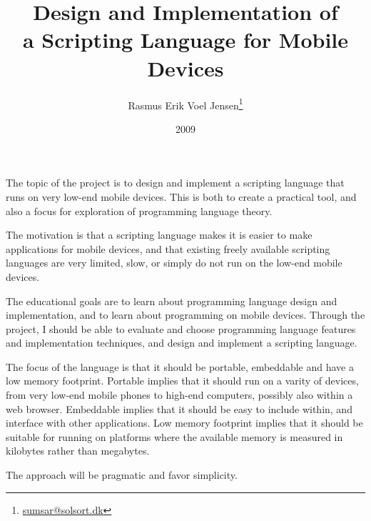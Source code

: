 \documentclass[12pt]{article}
\title{Design and Implementation of \\ a Scripting Language for Mobile Devices}
\author{Rasmus Erik Voel Jensen\footnote{\url{sumsar@solsort.dk}}
}
\date{2009}
\begin{document}
\maketitle


    The topic of the project is to design and implement a scripting language
that runs on very low-end mobile devices. This is both to create a practical tool, and
also a focus for exploration of programming language theory. 

The motivation is that a scripting language makes it is easier to make applications for mobile 
devices, and that existing freely available scripting languages
are very limited, slow, or simply do not run on the low-end mobile devices.

    The educational goals are to learn about programming language design and
implementation, and to learn about programming on mobile devices. Through the
project, I should be able to evaluate and choose programming language features
and implementation techniques, and design and implement a scripting language.

    The focus of the language is that it should be portable, embeddable and have
a low memory footprint. Portable implies that it should run on a varity of devices,
from very low-end mobile phones to high-end computers, possibly also within a web browser. 
Embeddable implies that it should be easy to include within, and interface with
other applications. Low memory footprint implies that it should be suitable for
running on platforms where the available memory is measured in kilobytes rather
than megabytes. 

    The approach will be pragmatic and favor simplicity.
\end{document}
